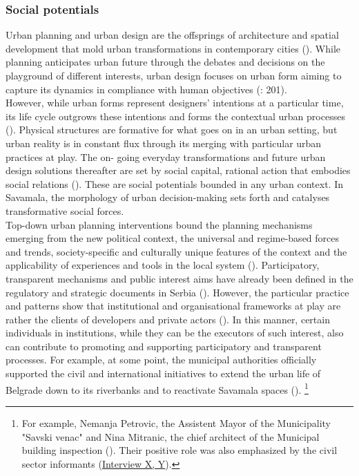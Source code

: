 \documentclass[11pt]{report}
\begin{document}
{{{{\subsubsection{Social potentials}

Urban planning and urban design are the offsprings of architecture and spatial development that mold urban transformations in contemporary cities (\href{ref}{\citealt{rode_city_2006}}).
While planning anticipates urban future through the debates and decisions on the playground of different interests, urban design focuses on urban form aiming to capture its dynamics in compliance with human objectives (\href{ref}{\citealt{lynch_theory_1958}}: 201).
\\

However, while urban forms represent designers’ intentions at a particular time, its life cycle outgrows these intentions and forms the contextual urban processes (\href{ref}{\citealt{tonkiss_cities_2014}}).
Physical structures are formative for what goes on in an urban setting, but urban reality is in constant flux through its merging with particular urban practices at play. The on- going everyday transformations and future urban design solutions thereafter are set by social capital, rational action that embodies social relations (\href{ref}{\citealt{coleman_social_1988}}).
These are social potentials bounded in any urban context.
In Savamala, the morphology of urban decision-making sets forth and catalyses transformative social forces.
\\

Top-down urban planning interventions bound the planning mechanisms emerging from the new political context, the universal and regime-based forces and trends, society-specific and culturally unique features of the context and the applicability of experiences and tools in the local system (\href{ref}{\citealt{nedovic-budic_adjustment_2001}}).
Participatory, transparent mechanisms and public interest aims have already been defined in the regulatory and strategic documents in Serbia  (\href{ref}{\citealt{vujosevic_conundrum_2012}}).
However, the particular practice and patterns show that institutional and organisational frameworks at play are rather the clients of developers and private actors (\href{ref}{\citealt{mrdjenovic_tatjana_urban_2015}}).
In this manner, certain individuals in institutions, while they can be the executors of such interest, also can contribute to promoting and supporting participatory and transparent processes.
For example, at some point, the municipal authorities officially supported the civil and international initiatives to extend the urban life of Belgrade down to its riverbanks and to reactivate Savamala spaces (\href{ref}{\citealt{doytchinov_urban_2015}}).
\footnote{For example, Nemanja Petrovic, the Assistent Mayor of the Municipality "Savski venac" and Nina Mitranic, the chief architect of the Municipal building inspection (\href{ref}{\citealt{doytchinov_urban_2015}}). Their positive role was also emphasized by the civil sector informants (\href{InterviewX}{Interview X, Y}).}
\\

}}}}
\end{document}
